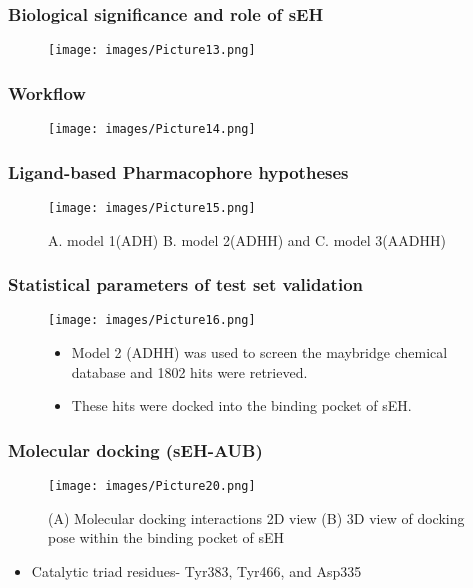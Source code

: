 \documentclass{beamer}
\begin{document}
\begin{frame}
\frametitle{\textbf{Biological significance and role of sEH}}
\begin{figure}
\texttt{[image: images/Picture13.png]}
\end{figure}
\end{frame}

\begin{frame}
\frametitle{\textbf{Workflow}}
\begin{figure}
\texttt{[image: images/Picture14.png]}
\end{figure}
\end{frame}

\begin{frame}
\frametitle{\textbf{Ligand-based Pharmacophore hypotheses}}
\begin{figure}
\texttt{[image: images/Picture15.png]}
\caption{A. model 1(ADH) B. model 2(ADHH)  and C. model 3(AADHH)}
\end{figure}
\end{frame}

\begin{frame}
\frametitle{\textbf{Statistical parameters of test set validation}}
\begin{figure}
\texttt{[image: images/Picture16.png]}
\begin{itemize}
\item Model 2 (ADHH) was used to screen the maybridge chemical database and 1802 hits were retrieved.
\item These hits were docked into the binding pocket of sEH.
\end{itemize}
\end{figure}
\end{frame}

\begin{frame}
\frametitle{\textbf{Molecular docking (sEH-AUB)}}
\begin{figure}
\texttt{[image: images/Picture20.png]}
\caption{(A) Molecular docking interactions 2D view (B) 3D view of docking pose within the binding pocket of sEH}
\end{figure}
\begin{itemize}
\item Catalytic triad residues- Tyr383, Tyr466, and Asp335
\end{itemize}
\end{frame}
\end{document}
